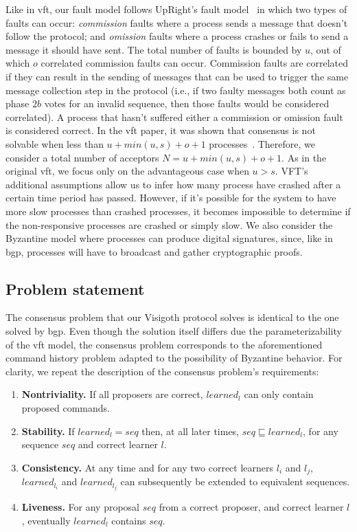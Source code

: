 Like in \acrshort{vft}, our fault model follows UpRight's fault model~\cite{Clement:2009} in which two types of faults can occur: \textit{commission} faults where a process sends a message that doesn't follow the protocol; and \textit{omission} faults where a process crashes or fails to send a message it should have sent. The total number of faults is bounded by $u$, out of which $o$ correlated commission faults can occur. Commission faults are correlated if they can result in the sending of messages that can be used to trigger the same message collection step in the protocol {\color{red}(i.e., if two faulty messages both count as phase $2b$ votes for an invalid sequence, then those faults would be considered correlated)}. A process that hasn't suffered either a commission or omission fault is considered correct. In the \acrshort{vft} paper, it was shown that consensus is not solvable when less than $u+min(u,s)+o+1$ processes~\cite{Porto2015}. Therefore, we consider a total number of acceptors $N = u + min(u,s)+o+1$. As in the original \acrshort{vft}, we focus only on the advantageous case when $u>s$. VFT's additional assumptions allow us to infer how many process have crashed after a certain time period has passed. However, if it's possible for the system to have more slow processes than crashed processes, it becomes impossible to determine if the non-responsive processes are crashed or simply slow.	We also consider the Byzantine model where processes can produce digital signatures, since, like in \acrshort{bgp}, processes will have to broadcast and gather cryptographic proofs.

\subsection{Problem statement}
The consensus problem that our Visigoth protocol solves is identical to the one solved by \acrshort{bgp}. Even though the solution itself differs due the parameterizability of the \acrshort{vft} model, the consensus problem corresponds to the aforementioned command history problem adapted to the possibility of Byzantine behavior. For clarity, we repeat the description of the consensus problem's requirements:

\begin{enumerate}
	\item \textbf{Nontriviality.} If all proposers are correct, $learned_l$ can only contain proposed commands.
	\item \textbf{Stability.} If $learned_l = seq$ then, at all later times, $seq \sqsubseteq learned_l$, for any sequence $seq$ and correct learner $l$.
	\item \textbf{Consistency.} At any time and for any two correct learners $l_i$ and $l_j$, $learned_{l_i}$ and $learned_{l_j}$ can subsequently be extended to equivalent sequences.
	\item \textbf{Liveness.} For any proposal $seq$ from a correct proposer, and correct learner $l$, eventually $learned_l$ contains $seq$.
\end{enumerate}